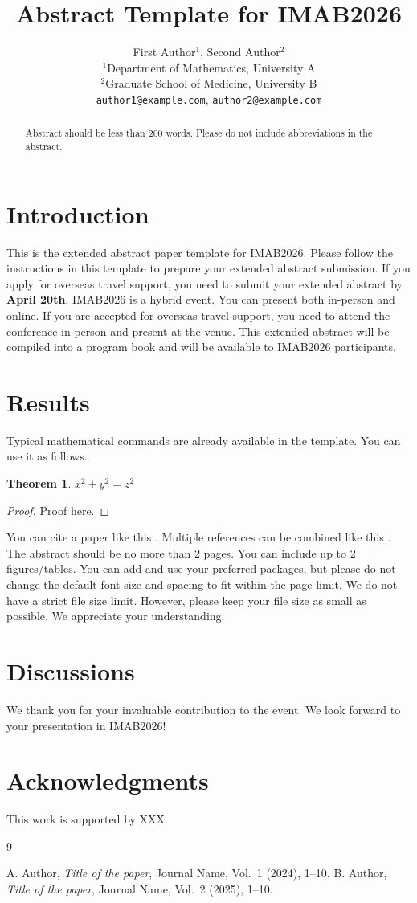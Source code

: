 \documentclass[a4paper,11pt]{article}
\title{\bfseries Abstract Template for IMAB2026}
\author{
First Author$^{1}$,
Second Author$^{2}$\\[0.5ex]
$^{1}$Department of Mathematics, University A\\
$^{2}$Graduate School of Medicine, University B\\
\texttt{author1@example.com},
\texttt{author2@example.com}
}
\date{}
\theoremstyle{plain}
\newtheorem{theorem}{Theorem}
\theoremstyle{definition}
\theoremstyle{remark}
\begin{document}
\maketitle

\begin{abstract}
Abstract should be less than 200 words. Please do not include abbreviations in the abstract.
\end{abstract}

\section{Introduction}
This is the extended abstract paper template for IMAB2026. Please follow the instructions in this template to prepare your extended abstract submission. If you apply for overseas travel support, you need to submit your extended abstract by \textbf{April 20th}.
IMAB2026 is a hybrid event. You can present both in-person and online. If you are accepted for overseas travel support, you need to attend the conference in-person and present at the venue. This extended abstract will be compiled into a program book and will be available to IMAB2026 participants.
\section{Results}
Typical mathematical commands are already available in the template. You can use it as follows.
\begin{theorem}
$x^2 + y^2 = z^2$
\end{theorem}
\begin{proof}
Proof here.
\end{proof}
You can cite a paper like this \cite{sample1}. Multiple references can be combined like this \cite{sample1, sample2}.
The abstract should be no more than 2 pages. You can include up to 2 figures/tables.
You can add and use your preferred packages, but please do not change the default font size and spacing to fit within the page limit. We do not have a strict file size limit. However, please keep your file size as small as possible. We appreciate your understanding.
\section{Discussions}
We thank you for your invaluable contribution to the event. We look forward to your presentation in IMAB2026!
\section*{Acknowledgments}
This work is supported by XXX.
\begin{thebibliography}{9}

A. Author,
\textit{Title of the paper},
Journal Name, Vol.~1 (2024), 1--10.
B. Author,
\textit{Title of the paper},
Journal Name, Vol.~2 (2025), 1--10.

\end{thebibliography}
\end{document}
